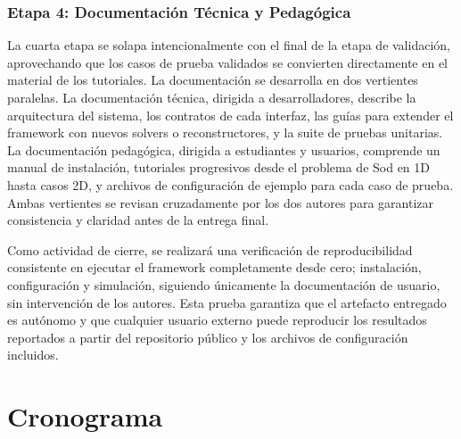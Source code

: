 \documentclass[11pt,openany]{book}
\begin{document}
\subsection{Etapa 4: Documentación Técnica y Pedagógica}

La cuarta etapa se solapa intencionalmente con el final de la etapa de validación, aprovechando que los casos de prueba validados se convierten directamente en el material de los tutoriales. La documentación se desarrolla en dos vertientes paralelas.
La documentación técnica, dirigida a desarrolladores, describe la arquitectura del sistema, los contratos de cada interfaz, las guías para extender el framework con nuevos solvers o reconstructores, y la suite de pruebas unitarias. La documentación pedagógica, dirigida a estudiantes y usuarios, comprende un manual de instalación, tutoriales progresivos desde el problema de Sod en 1D hasta casos 2D, y archivos de configuración de ejemplo para cada caso de prueba. Ambas vertientes se revisan cruzadamente por los dos autores para garantizar consistencia y claridad antes de la entrega final.

Como actividad de cierre, se realizará una verificación de reproducibilidad consistente en ejecutar el framework completamente desde cero; instalación, configuración y simulación, siguiendo únicamente la documentación de usuario, sin intervención de los autores. Esta prueba garantiza que el artefacto entregado es autónomo y que cualquier usuario externo puede reproducir los resultados reportados a partir del repositorio público y los archivos de configuración incluidos.

\chapter{Cronograma}
\end{document}

